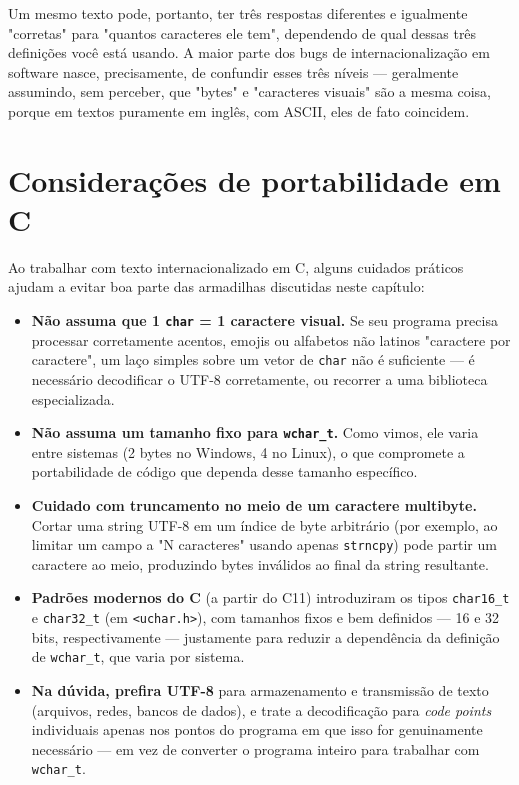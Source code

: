 \documentclass[12pt,a4paper,oneside]{extreport}
\begin{document}
Um mesmo texto pode, portanto, ter três respostas diferentes e igualmente "corretas" para "quantos caracteres ele tem", dependendo de qual dessas três definições você está usando. A maior parte dos bugs de internacionalização em software nasce, precisamente, de confundir esses três níveis — geralmente assumindo, sem perceber, que "bytes" e "caracteres visuais" são a mesma coisa, porque em textos puramente em inglês, com ASCII, eles de fato coincidem.

\section*{Considerações de portabilidade em C}

Ao trabalhar com texto internacionalizado em C, alguns cuidados práticos ajudam a evitar boa parte das armadilhas discutidas neste capítulo:

\begin{itemize}
    \item \textbf{Não assuma que 1 \texttt{char} = 1 caractere visual.} Se seu programa precisa processar corretamente acentos, emojis ou alfabetos não latinos "caractere por caractere", um laço simples sobre um vetor de \texttt{char} não é suficiente — é necessário decodificar o UTF-8 corretamente, ou recorrer a uma biblioteca especializada.
    \item \textbf{Não assuma um tamanho fixo para \texttt{wchar\_t}.} Como vimos, ele varia entre sistemas (2 bytes no Windows, 4 no Linux), o que compromete a portabilidade de código que dependa desse tamanho específico.
    \item \textbf{Cuidado com truncamento no meio de um caractere multibyte.} Cortar uma string UTF-8 em um índice de byte arbitrário (por exemplo, ao limitar um campo a "N caracteres" usando apenas \texttt{strncpy}) pode partir um caractere ao meio, produzindo bytes inválidos ao final da string resultante.
    \item \textbf{Padrões modernos do C} (a partir do C11) introduziram os tipos \texttt{char16\_t} e \texttt{char32\_t} (em \texttt{<uchar.h>}), com tamanhos fixos e bem definidos — 16 e 32 bits, respectivamente — justamente para reduzir a dependência da definição de \texttt{wchar\_t}, que varia por sistema.
    \item \textbf{Na dúvida, prefira UTF-8} para armazenamento e transmissão de texto (arquivos, redes, bancos de dados), e trate a decodificação para \textit{code points} individuais apenas nos pontos do programa em que isso for genuinamente necessário — em vez de converter o programa inteiro para trabalhar com \texttt{wchar\_t}.
\end{itemize}
\end{document}
